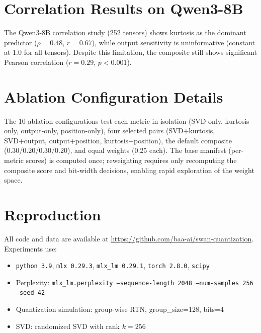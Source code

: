 \documentclass{article}
\begin{document}

\appendix

\section{Correlation Results on Qwen3-8B}
\label{app:corr_8b}



The Qwen3-8B correlation study (252 tensors) shows kurtosis as the dominant predictor ($\rho = 0.48$, $r = 0.67$), while output sensitivity is uninformative (constant at 1.0 for all tensors). Despite this limitation, the composite still shows significant Pearson correlation ($r = 0.29$, $p < 0.001$).

\section{Ablation Configuration Details}
\label{app:ablation_details}

The 10 ablation configurations test each metric in isolation (SVD-only, kurtosis-only, output-only, position-only), four selected pairs (SVD+kurtosis, SVD+output, output+position, kurtosis+position), the default composite (0.30/0.20/0.30/0.20), and equal weights (0.25 each). The base manifest (per-metric scores) is computed once; reweighting requires only recomputing the composite score and bit-width decisions, enabling rapid exploration of the weight space.

\section{Reproduction}
\label{app:reproduction}

All code and data are available at \url{https://github.com/baa-ai/swan-quantization}. Experiments use:
\begin{itemize}
    \item \texttt{python 3.9}, \texttt{mlx 0.29.3}, \texttt{mlx\_lm 0.29.1}, \texttt{torch 2.8.0}, \texttt{scipy}
    \item Perplexity: \texttt{mlx\_lm.perplexity --sequence-length 2048 --num-samples 256 --seed 42}
    \item Quantization simulation: group-wise RTN, group\_size=128, bits=4
    \item SVD: randomized SVD with rank $k = 256$
\end{itemize}
\end{document}
